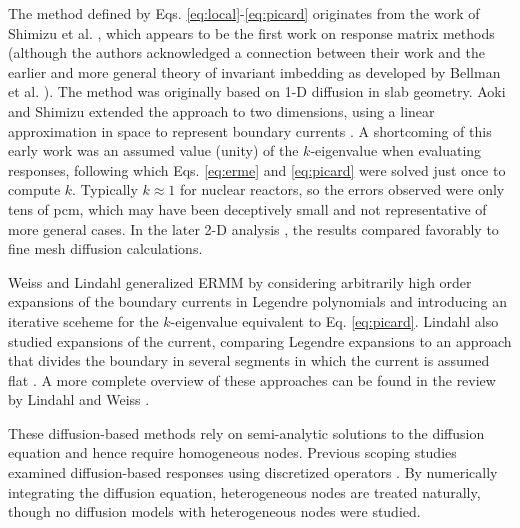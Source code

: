 The method defined by Eqs. \ref{eq:local}-\ref{eq:picard}
originates from the work of Shimizu et al. 
\cite{shimizu1963rmm, shimizu1963arm}, which appears to be the first work 
on response matrix methods (although the authors acknowledged a 
connection between their work and the earlier and more general 
theory of invariant imbedding as developed by Bellman et al. 
\cite{bellman1960iim}).  The method was originally based on 1-D diffusion 
in slab geometry. Aoki and Shimizu extended the approach to two dimensions, 
using a linear approximation in space to represent boundary
currents \cite{aoki1965arm}.
A shortcoming of this early work was an assumed value (unity) of 
the $k$-eigenvalue when evaluating responses, following which 
Eqs. \ref{eq:erme} and \ref{eq:picard} were solved just once 
to compute $k$.
Typically $k \approx 1$ for nuclear reactors, so the errors observed 
were only tens of pcm, which may have been deceptively small
and not representative of more general cases.  
In the later 2-D analysis \cite{aoki1965arm}, the results compared 
favorably to fine mesh diffusion calculations.

Weiss and Lindahl generalized ERMM by considering arbitrarily 
high order expansions of the boundary currents in Legendre 
polynomials \cite{weiss1975hor} and introducing an 
iterative sceheme for the $k$-eigenvalue equivalent to Eq. \ref{eq:picard}.
Lindahl also studied expansions of the current, comparing Legendre 
expansions to an approach that divides the boundary in several segments 
in which the current is assumed flat \cite{lindahl1976mdr}.  A more
complete overview of these approaches can be found in the review by Lindahl
and Weiss \cite{lindahl1981rrm}.

These diffusion-based methods rely on semi-analytic solutions to the 
diffusion equation and hence require homogeneous nodes. Previous 
scoping studies examined diffusion-based responses using discretized 
operators \cite{roberts2011ser}.  By numerically integrating the diffusion 
equation, heterogeneous nodes are treated naturally, though no diffusion 
models with heterogeneous nodes were studied.


